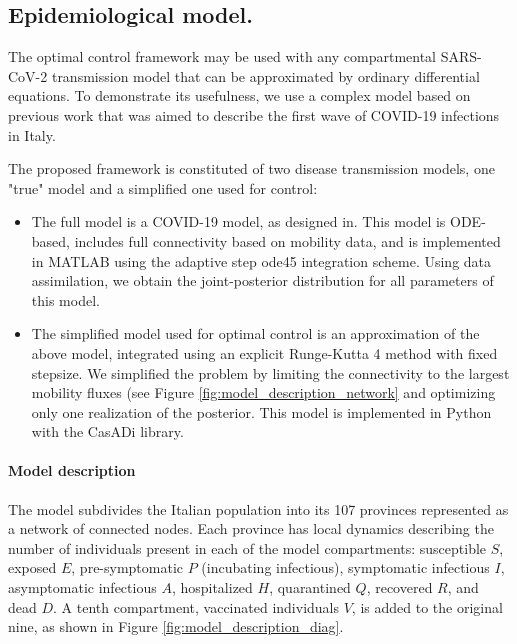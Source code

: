 \subsection{Epidemiological model.} 
The optimal control framework may be used with any compartmental SARS-CoV-2 transmission model that can be approximated by ordinary differential equations. To demonstrate its usefulness, we use a complex model based on previous work that was aimed to describe the first wave of COVID-19 infections in Italy\cite{Gatto:SpreadDynamicsCOVID19:2020,Bertuzzo:GeographyCOVID19Spread:2020}. 

The proposed framework is constituted of two disease transmission models, one "true" model and a simplified one used for control:
\begin{itemize}
    \item The full model is a COVID-19 model, as designed in\cite{Gatto:SpreadDynamicsCOVID19:2020, Bertuzzo:GeographyCOVID19Spread:2020}. This model is ODE-based, includes full connectivity based on mobility data, and is implemented in MATLAB using the adaptive step ode45 integration scheme. Using data assimilation, we obtain the joint-posterior distribution for all parameters of this model. 
    \item The simplified model used for optimal control is an approximation of the above model, integrated using an explicit Runge-Kutta 4 method with fixed stepsize. We simplified the problem by limiting the connectivity to the largest mobility fluxes (see Figure \ref{fig:model_description_network} and optimizing only one realization of the posterior. This model is implemented in Python with the CasADi library.
\end{itemize}

\paragraph{Model description}
The model subdivides the Italian population into its 107 provinces represented as a network of connected nodes. Each province has local dynamics describing the number of individuals present in each of the model compartments: susceptible $S$, exposed $E$, pre-symptomatic $P$ (incubating infectious), symptomatic infectious $I$, asymptomatic infectious $A$, hospitalized $H$, quarantined $Q$, recovered $R$, and dead $D$. A tenth compartment, vaccinated individuals $V$, is added to the original nine, as shown in Figure \ref{fig:model_description_diag}.

